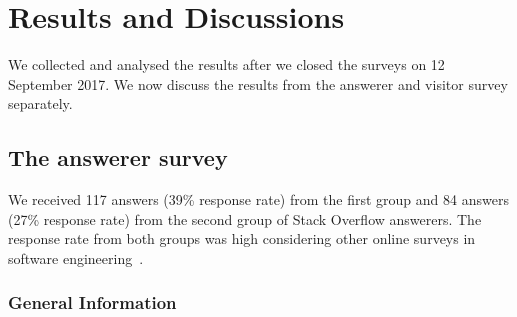 \documentclass{svjour3}                     %
\begin{document}
\section{Results and Discussions}
We collected and analysed the results after we closed the surveys on 12
September 2017. We now discuss the results from the answerer and
visitor survey separately.

\subsection{The answerer survey}
We received 117 answers (39\% response rate) from the first group and 84 answers
(27\% response rate) from the second group of Stack Overflow answerers. The response
rate from both groups was high considering other online surveys in software
engineering~\citep{Punter2003}.

\subsubsection{General Information}

\end{document}
